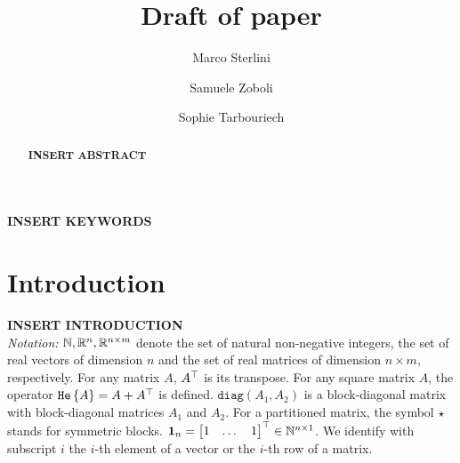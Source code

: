 \documentclass{ifacconf}
\theoremstyle{plain}
\begin{document}
\begin{frontmatter}

\title{Draft of paper}

\author[First]{Marco Sterlini}
\author[Second]{Samuele Zoboli}
\author[Second]{Sophie Tarbouriech}

\address[First]{Università di Trento, Trento, Italy (e-mail: marco.sterlini@studenti.unitn.it) }
\address[Second]{LAAS-CNRS, Université de Toulouse, CNRS, Toulouse, France (e-mail:bu) }


\begin{abstract}
\textbf{INSERT ABSTRACT}
\end{abstract}

\begin{keyword}
\textbf{INSERT KEYWORDS}
\end{keyword}

\end{frontmatter}

\section{Introduction}
\textbf{INSERT INTRODUCTION}\\
\emph{Notation:} ${\mathbb{N}}, {\mathbb{R}}^{n}, {\mathbb{R}}^{n \times m}$ denote the set of natural non-negative integers, the set of real vectors of dimension $n$ and the set of real matrices of dimension $n \times m$, respectively. For any matrix $A$, $A^\top$ is its transpose. For any square matrix $A$, the operator $\texttt{\relax{He}}\left\{{ A }\right\} = A + A^\top$ is defined. $\texttt{diag}(A_1, A_2)$ is a block-diagonal matrix with block-diagonal matrices $A_1$ and $A_2$. For a partitioned matrix, the symbol $\star$ stands for symmetric blocks. $\operatorname{\mathbf{1}}_n = \left[\begin{matrix}1 & \dots & 1\end{matrix}\right]^\top \in {\mathbb{N}}^{n \times 1}$. We identify with subscript $i$ the $i$-th element of a vector or the $i$-th row of a matrix.
\end{document}
